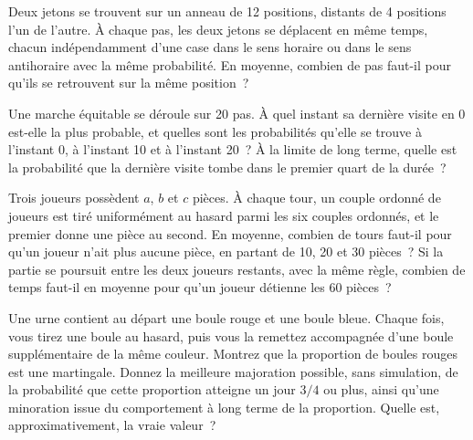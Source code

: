 \begin{question}\label{iq:iv1:random-walks-and-martingales:15}
Deux jetons se trouvent sur un anneau de 12 positions, distants de 4 positions l'un de l'autre. À chaque pas, les deux jetons se déplacent en même temps, chacun indépendamment d'une case dans le sens horaire ou dans le sens antihoraire avec la même probabilité. En moyenne, combien de pas faut-il pour qu'ils se retrouvent sur la même position~?
\end{question}

\begin{question}\label{iq:iv1:random-walks-and-martingales:16}
Une marche équitable se déroule sur 20 pas. À quel instant sa dernière visite en 0 est-elle la plus probable, et quelles sont les probabilités qu'elle se trouve à l'instant 0, à l'instant 10 et à l'instant 20~? À la limite de long terme, quelle est la probabilité que la dernière visite tombe dans le premier quart de la durée~?
\end{question}

\begin{question}\label{iq:iv1:random-walks-and-martingales:17}
Trois joueurs possèdent $a$, $b$ et $c$ pièces. À chaque tour, un couple ordonné de joueurs est tiré uniformément au hasard parmi les six couples ordonnés, et le premier donne une pièce au second. En moyenne, combien de tours faut-il pour qu'un joueur n'ait plus aucune pièce, en partant de 10, 20 et 30 pièces~? Si la partie se poursuit entre les deux joueurs restants, avec la même règle, combien de temps faut-il en moyenne pour qu'un joueur détienne les 60 pièces~?
\end{question}

\begin{question}\label{iq:iv1:random-walks-and-martingales:18}
Une urne contient au départ une boule rouge et une boule bleue. Chaque fois, vous tirez une boule au hasard, puis vous la remettez accompagnée d'une boule supplémentaire de la même couleur. Montrez que la proportion de boules rouges est une martingale. Donnez la meilleure majoration possible, sans simulation, de la probabilité que cette proportion atteigne un jour $3/4$ ou plus, ainsi qu'une minoration issue du comportement à long terme de la proportion. Quelle est, approximativement, la vraie valeur~?
\end{question}

